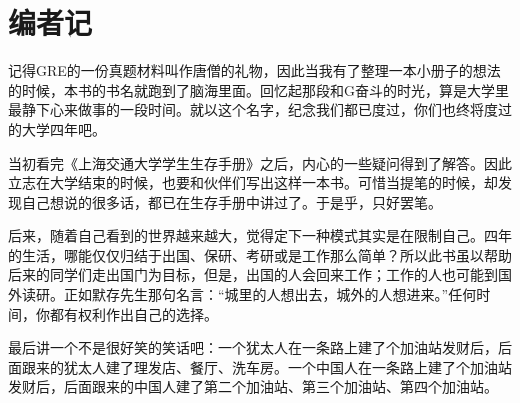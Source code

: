 \chapter*{编者记}
\pagestyle{plain}

记得GRE的一份真题材料叫作唐僧的礼物，因此当我有了整理一本小册子的想法的时候，本书的书名就跑到了脑海里面。回忆起那段和G奋斗的时光，算是大学里最静下心来做事的一段时间。就以这个名字，纪念我们都已度过，你们也终将度过的大学四年吧。\par
当初看完《上海交通大学学生生存手册》之后，内心的一些疑问得到了解答。因此立志在大学结束的时候，也要和伙伴们写出这样一本书。可惜当提笔的时候，却发现自己想说的很多话，都已在生存手册中讲过了。于是乎，只好罢笔。\par
后来，随着自己看到的世界越来越大，觉得定下一种模式其实是在限制自己。四年的生活，哪能仅仅归结于出国、保研、考研或是工作那么简单？所以此书虽以帮助后来的同学们走出国门为目标，但是，出国的人会回来工作；工作的人也可能到国外读研。正如默存先生那句名言：“城里的人想出去，城外的人想进来。”任何时间，你都有权利作出自己的选择。\par
最后讲一个不是很好笑的笑话吧：一个犹太人在一条路上建了个加油站发财后，后面跟来的犹太人建了理发店、餐厅、洗车房。一个中国人在一条路上建了个加油站发财后，后面跟来的中国人建了第二个加油站、第三个加油站、第四个加油站。